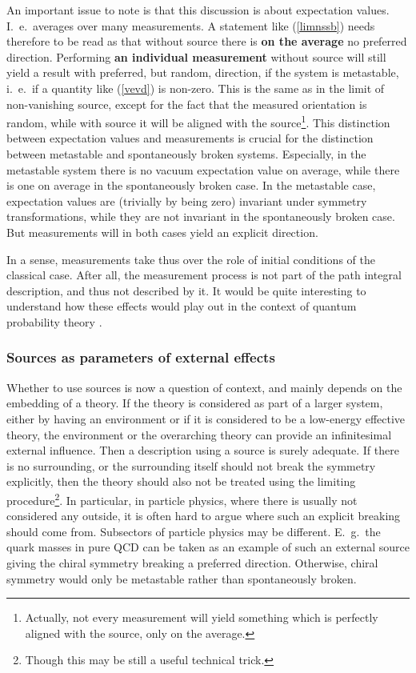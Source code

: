 \documentclass[final,twoside,12pt]{article}
\newcommand*{\pref}[1]{(\ref{#1})}
\newcommand*{\1}{1\!\!\!\bot}
\begin{document}
An important issue to note is that this discussion is about expectation values. I.\ e.\ averages over many measurements. A statement like \pref{limnssb} needs therefore to be read as that without source there is {\bf on the average} no preferred direction. Performing {\bf an individual measurement} without source will still yield a result with preferred, but random, direction, if the system is metastable, i.\ e.\ if a quantity like \pref{vevd} is non-zero. This is the same as in the limit of non-vanishing source, except for the fact that the measured orientation is random, while with source it will be aligned with the source\footnote{Actually, not every measurement will yield something which is perfectly aligned with the source, only on the average.}. This distinction between expectation values and measurements is crucial for the distinction between metastable and spontaneously broken systems. Especially, in the metastable system there is no vacuum expectation value on average, while there is one on average in the spontaneously broken case. In the metastable case, expectation values are (trivially by being zero) invariant under symmetry transformations, while they are not invariant in the spontaneously broken case. But measurements will in both cases yield an explicit direction.

In a sense, measurements take thus over the role of initial conditions of the classical case. After all, the measurement process is not part of the path integral description, and thus not described by it. It would be quite interesting to understand how these effects would play out in the context of quantum probability theory \cite{Frohlich:2015qpt}.

\subsubsection{Sources as parameters of external effects}

Whether to use sources is now a question of context, and mainly depends on the embedding of a theory. If the theory is considered as part of a larger system, either by having an environment or if it is considered to be a low-energy effective theory, the environment or the overarching theory can provide an infinitesimal external influence. Then a description using a source is surely adequate. If there is no surrounding, or the surrounding itself should not break the symmetry explicitly, then the theory should also not be treated using the limiting procedure\footnote{Though this may be still a useful technical trick.}. In particular, in particle physics, where there is usually not considered any outside, it is often hard to argue where such an explicit breaking should come from. Subsectors of particle physics may be different. E.\ g.\ the quark masses in pure QCD can be taken as an example of such an external source giving the chiral symmetry breaking a preferred direction. Otherwise, chiral symmetry would only be metastable rather than spontaneously broken.
\end{document}
